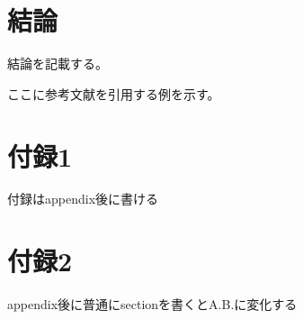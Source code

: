 \documentclass[titlepage]{jlreq}
\begin{document}
\section{結論}

結論を記載する。

ここに参考文献を引用する例を示す。

\cite{hon2}

\cite{hon1-a}

\cite{hon1-b}

\cite{webpage1}

\cite{handbook}







\appendix

\section{付録1}

付録はappendix後に書ける

\section{付録2}

appendix後に普通にsectionを書くとA.B.に変化する
\end{document}

